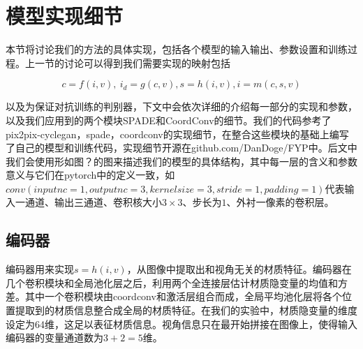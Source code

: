 \documentclass[UTF8,openany,AutoFakeBold,AutoFakeSlant,cs4size]{ctexbook}
\begin{document}
\section{模型实现细节}

本节将讨论我们的方法的具体实现，包括各个模型的输入输出、参数设置和训练过程。上一节的讨论可以得到我们需要实现的映射包括

\begin{equation}
	c = f(i, v),\ i_d = g(c, v), s = h(i ,v), i = m(c, s, v)
\end{equation}

以及为保证对抗训练的判别器，下文中会依次详细的介绍每一部分的实现和参数，以及我们应用到的两个模块SPADE和CoordConv的细节。我们的代码参考了pix2pix-cyclegan，spade，coordconv的实现细节，在整合这些模块的基础上编写了自己的模型和训练代码，实现细节开源在github.com/DanDoge/FYP中。后文中我们会使用形如图？的图来描述我们的模型的具体结构，其中每一层的含义和参数意义与它们在pytorch中的定义一致，如$conv(inputnc=1, outputnc=3, kernelsize=3, stride=1, padding=1)$代表输入一通道、输出三通道、卷积核大小$3 \times 3$、步长为$1$、外衬一像素的卷积层。

\subsection{编码器}

编码器用来实现$s = h(i, v)$，从图像中提取出和视角无关的材质特征。编码器在几个卷积模块和全局池化层之后，利用两个全连接层估计材质隐变量的均值和方差。其中一个卷积模块由coordconv和激活层组合而成，全局平均池化层将各个位置提取到的材质信息整合成全局的材质特征。在我们的实验中，材质隐变量的维度设定为64维，这足以表征材质信息。视角信息只在最开始拼接在图像上，使得输入编码器的变量通道数为$3 + 2 = 5$维。
\end{document}
